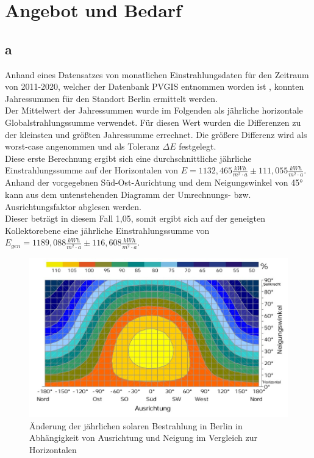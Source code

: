 \section{Angebot und Bedarf}
\label{sec:Angebot und Bedarf}
\subsection{a}
Anhand eines Datensatzes von monatlichen Einstrahlungsdaten für den Zeitraum von 2011-2020, welcher der Datenbank PVGIS entnommen worden ist \cite{PVGIS}, konnten Jahressummen für den Standort Berlin ermittelt werden.\\
Der Mittelwert der Jahressummen wurde im Folgenden als jährliche horizontale Globalstrahlungssumme verwendet.
Für diesen Wert wurden die Differenzen zu der kleinsten und größten Jahressumme errechnet.
Die größere Differenz wird als worst-case angenommen und als Toleranz $\Delta E$ festgelegt.\\
Diese erste Berechnung ergibt sich eine durchschnittliche jährliche Einstrahlungssumme
auf der Horizontalen von $E = 1132,465 \frac{kWh}{m^2\cdot a} \pm 111,055 \frac{kWh}{m^2\cdot a}$.\\
Anhand der vorgegebnen Süd-Ost-Aurichtung und dem Neigungswinkel von 45° kann aus dem untenstehenden Diagramm der Umrechnungs- bzw. Ausrichtungsfaktor abglesen werden.\\
Dieser beträgt in diesem Fall 1,05, somit ergibt sich auf der geneigten Kollektorebene eine jährliche Einstrahlungssumme von
$E_{gen} = 1189,088 \frac{kWh}{m^2\cdot a} \pm 116,608 \frac{kWh}{m^2\cdot a}$.

\begin{figure}[H]
  \centering
  \includegraphics[width=\textwidth]{Abbildungen/Ausrichtung.jpg}
  \caption{Änderung der jährlichen solaren Bestrahlung in Berlin in Abhängigkeit von Ausrichtung
  und Neigung im Vergleich zur Horizontalen \cite[S.92]{QUA19}}
  \label{fig:Ausrichtungsfaktor}
\end{figure}